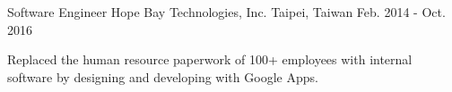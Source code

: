 \begin{cventries}
  \cventry
  {Software Engineer} %
  {Hope Bay Technologies, Inc.} %
  {Taipei, Taiwan} %
  {Feb. 2014 - Oct. 2016} %
  {
    \begin{cvitems} %
      \item {Replaced the human resource paperwork of 100+ employees with internal software by designing and developing with Google Apps.}
    \end{cvitems}
  }

\end{cventries}
